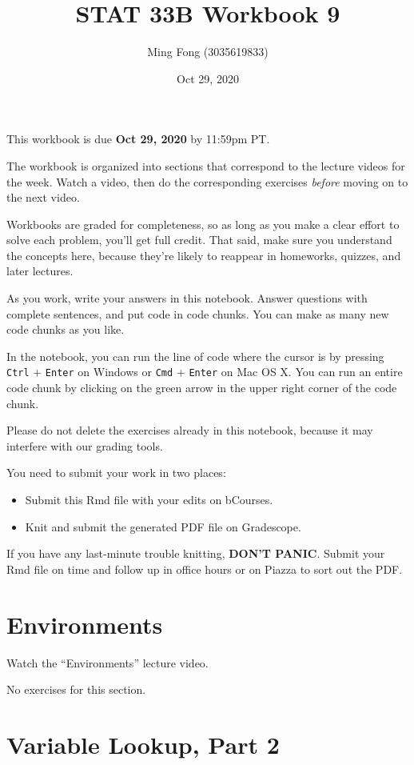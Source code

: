 \documentclass[
]{article}
\title{STAT 33B Workbook 9}
\author{Ming Fong (3035619833)}
\date{Oct 29, 2020}
\providecommand{\tightlist}{%
  \setlength{\itemsep}{0pt}\setlength{\parskip}{0pt}}
\begin{document}
\maketitle

This workbook is due \textbf{Oct 29, 2020} by 11:59pm PT.

The workbook is organized into sections that correspond to the lecture
videos for the week. Watch a video, then do the corresponding exercises
\emph{before} moving on to the next video.

Workbooks are graded for completeness, so as long as you make a clear
effort to solve each problem, you'll get full credit. That said, make
sure you understand the concepts here, because they're likely to
reappear in homeworks, quizzes, and later lectures.

As you work, write your answers in this notebook. Answer questions with
complete sentences, and put code in code chunks. You can make as many
new code chunks as you like.

In the notebook, you can run the line of code where the cursor is by
pressing \texttt{Ctrl} + \texttt{Enter} on Windows or \texttt{Cmd} +
\texttt{Enter} on Mac OS X. You can run an entire code chunk by clicking
on the green arrow in the upper right corner of the code chunk.

Please do not delete the exercises already in this notebook, because it
may interfere with our grading tools.

You need to submit your work in two places:

\begin{itemize}
\tightlist
\item
  Submit this Rmd file with your edits on bCourses.
\item
  Knit and submit the generated PDF file on Gradescope.
\end{itemize}

If you have any last-minute trouble knitting, \textbf{DON'T PANIC}.
Submit your Rmd file on time and follow up in office hours or on Piazza
to sort out the PDF.

\hypertarget{environments}{%
\section{Environments}\label{environments}}

Watch the ``Environments'' lecture video.

No exercises for this section.

\hypertarget{variable-lookup-part-2}{%
\section{Variable Lookup, Part 2}\label{variable-lookup-part-2}}
\end{document}
